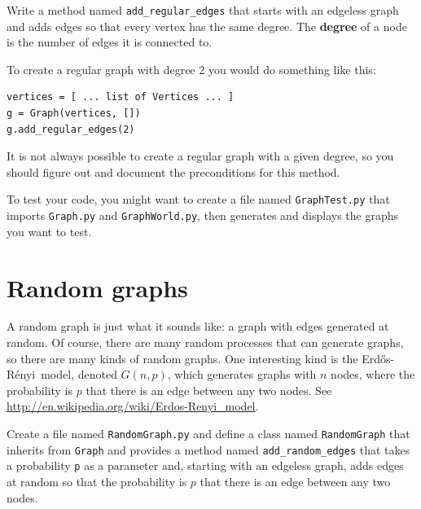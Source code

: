 \documentclass[10pt]{book}
\begin{document}
\begin{exercise}

Write a method named \verb"add_regular_edges" that starts with an
edgeless graph and adds edges so that every vertex has the same
degree.  The {\bf degree} of a node is the number of edges it is
connected to.

To create a regular graph with degree 2 you would do something
like this:
%
\begin{verbatim}
vertices = [ ... list of Vertices ... ]
g = Graph(vertices, [])
g.add_regular_edges(2)
\end{verbatim}
%
It is not always possible to create a regular graph
with a given degree, so you should figure out and document the
preconditions for this method.

To test your code, you might want to create a file named
{\tt GraphTest.py} that imports {\tt Graph.py} and
{\tt GraphWorld.py}, then generates and displays the graphs
you want to test.

\end{exercise}


\newcommand{\Erdos}{Erd\H{o}s}
\newcommand{\Renyi}{R\'{e}nyi}

\section{Random graphs}

A random graph is just what it sounds like: a graph with edges
generated at random.  Of course, there are many random processes that
can generate graphs, so there are many kinds of random graphs.  One
interesting kind is the \Erdos-\Renyi~model, denoted $G(n,p)$, which
generates graphs with $n$ nodes, where the probability is $p$ that
there is an edge between any two nodes.  See
\url{http://en.wikipedia.org/wiki/Erdos-Renyi_model}.
\index{Erdos-Renyi model@\Erdos-\Renyi~model}

\begin{exercise}
\label{ex.randomgraph}

Create a file named {\tt RandomGraph.py} and define a class named
{\tt RandomGraph} that inherits from {\tt Graph} and provides a method
named \verb"add_random_edges" that takes a probability {\tt p} as a
parameter and, starting with an edgeless graph, adds edges at random
so that the probability is $p$ that there is an edge between any two
nodes.

\end{exercise}
\end{document}
